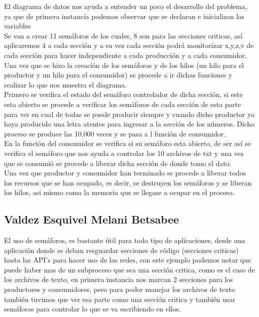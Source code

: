 \documentclass[11pt,a4paper]{article}
\begin{document}
El diagrama de datos nos ayuda a entender un poco el desarrollo del problema, ya que de primera instancia podemos observar que se declaran e inicializan las variables\\
Se van a crear 11 semáforos de los cuales, 8 son para las secciones criticas, así aplicaremos 4 a cada sección y a su vez cada sección podrá monitorizar x,y,z,v de cada sección para hacer independiente a cada producción y a cada consumidor.\\
Una vez que se hizo la creación de los semáforos y de los hilos (un hilo para el productor y un hilo para el consumidor) se procede a ir  dichas funciones y realizar lo que nos muestra el diagrama.\\
Primero se verifica el estado del semáforo controlador de dicha sección, si este esta abierto se procede a verificar los semáforos de cada sección de esta parte para ver en cual de todas se puede producir siempre y cuando dicho productor ya haya producido una letra atentes para ingresar a la sección de los números. Dicho proceso se produce las 10,000 veces y se pasa a l función de consumidor.\\
En la función del consumidor se verifica si su semáforo esta abierto, de ser así se verifica el semáforo que nos ayuda a controlar los 10 archivos de txt y una vez que se consumió se procede a liberar dicha sección de donde tomo el dato.\\
Una vez que productor y consumidor han terminado se procede a liberar todos los recursos que se han ocupado, es decir, se destruyen los semáforos y se liberan los hilos, asi mismo como la memoria que se llegase a ocupar en el proceso.

\subsection{Valdez Esquivel Melani Betsabee}
El uso de semáforos, es bastante útil para todo tipo de aplicaciones, desde una aplicación donde se deban resguardar secciones de código (secciones criticas) hasta las API's para hacer uso de las redes, con este ejemplo podemos notar que puede haber mas de un subproceso que sea una sección critica, como es el caso de los archivos de texto, en primera instancia nos marcan 2 secciones para los productores y consumidores, pero para poder manejar los archivos de texto también tuvimos que ver esa parte como una sección critica y también usar semáforos para controlar lo que se va escribiendo en ellos.
\end{document}
